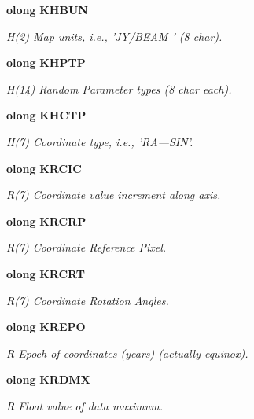\begin{CompactItemize}
{\bf olong} {\bf KHBUN}
\begin{CompactList}\small\item\em H(2) Map units, i.e., 'JY/BEAM ' (8 char). \item\end{CompactList}\item 
{\bf olong} {\bf KHPTP}
\begin{CompactList}\small\item\em H(14) Random Parameter types (8 char each). \item\end{CompactList}\item 
{\bf olong} {\bf KHCTP}
\begin{CompactList}\small\item\em H(7) Coordinate type, i.e., 'RA---SIN'. \item\end{CompactList}\item 
{\bf olong} {\bf KRCIC}
\begin{CompactList}\small\item\em R(7) Coordinate value increment along axis. \item\end{CompactList}\item 
{\bf olong} {\bf KRCRP}
\begin{CompactList}\small\item\em R(7) Coordinate Reference Pixel. \item\end{CompactList}\item 
{\bf olong} {\bf KRCRT}
\begin{CompactList}\small\item\em R(7) Coordinate Rotation Angles. \item\end{CompactList}\item 
{\bf olong} {\bf KREPO}
\begin{CompactList}\small\item\em R Epoch of coordinates (years) (actually equinox). \item\end{CompactList}\item 
{\bf olong} {\bf KRDMX}
\begin{CompactList}\small\item\em R Float value of data maximum. \item\end{CompactList}\item 

\end{CompactItemize}
